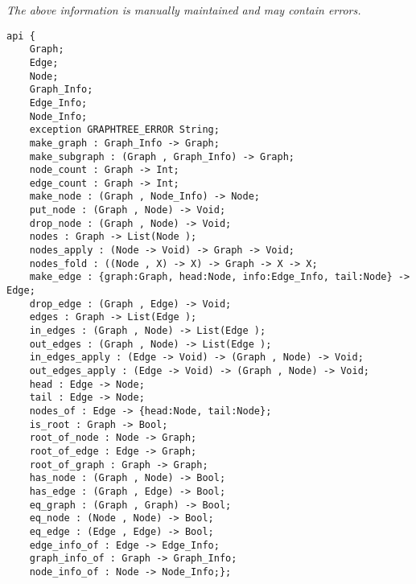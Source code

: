 \label{api:Graphtree}

{\tiny \it The above information is manually maintained and may contain errors.}
\begin{verbatim}
api {
    Graph;
    Edge;
    Node;
    Graph_Info;
    Edge_Info;
    Node_Info;
    exception GRAPHTREE_ERROR String;
    make_graph : Graph_Info -> Graph;
    make_subgraph : (Graph , Graph_Info) -> Graph;
    node_count : Graph -> Int;
    edge_count : Graph -> Int;
    make_node : (Graph , Node_Info) -> Node;
    put_node : (Graph , Node) -> Void;
    drop_node : (Graph , Node) -> Void;
    nodes : Graph -> List(Node );
    nodes_apply : (Node -> Void) -> Graph -> Void;
    nodes_fold : ((Node , X) -> X) -> Graph -> X -> X;
    make_edge : {graph:Graph, head:Node, info:Edge_Info, tail:Node} -> Edge;
    drop_edge : (Graph , Edge) -> Void;
    edges : Graph -> List(Edge );
    in_edges : (Graph , Node) -> List(Edge );
    out_edges : (Graph , Node) -> List(Edge );
    in_edges_apply : (Edge -> Void) -> (Graph , Node) -> Void;
    out_edges_apply : (Edge -> Void) -> (Graph , Node) -> Void;
    head : Edge -> Node;
    tail : Edge -> Node;
    nodes_of : Edge -> {head:Node, tail:Node};
    is_root : Graph -> Bool;
    root_of_node : Node -> Graph;
    root_of_edge : Edge -> Graph;
    root_of_graph : Graph -> Graph;
    has_node : (Graph , Node) -> Bool;
    has_edge : (Graph , Edge) -> Bool;
    eq_graph : (Graph , Graph) -> Bool;
    eq_node : (Node , Node) -> Bool;
    eq_edge : (Edge , Edge) -> Bool;
    edge_info_of : Edge -> Edge_Info;
    graph_info_of : Graph -> Graph_Info;
    node_info_of : Node -> Node_Info;};
\end{verbatim}

